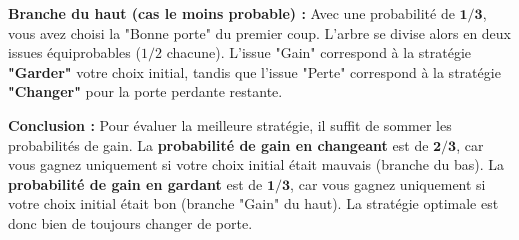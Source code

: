 \begin{proofbox}
\vspace{0.3cm}
\noindent\textbf{Branche du haut (cas le moins probable) :}
\newline
Avec une probabilité de $\mathbf{1/3}$, vous avez choisi la "Bonne porte" du premier coup. L'arbre se divise alors en deux issues équiprobables ($1/2$ chacune). L'issue "Gain" correspond à la stratégie \textbf{"Garder"} votre choix initial, tandis que l'issue "Perte" correspond à la stratégie \textbf{"Changer"} pour la porte perdante restante.

\vspace{0.3cm}
\noindent\textbf{Conclusion :}
\newline
Pour évaluer la meilleure stratégie, il suffit de sommer les probabilités de gain. La \textbf{probabilité de gain en changeant} est de $\mathbf{2/3}$, car vous gagnez uniquement si votre choix initial était mauvais (branche du bas). La \textbf{probabilité de gain en gardant} est de $\mathbf{1/3}$, car vous gagnez uniquement si votre choix initial était bon (branche "Gain" du haut). La stratégie optimale est donc bien de toujours changer de porte.
\end{proofbox}